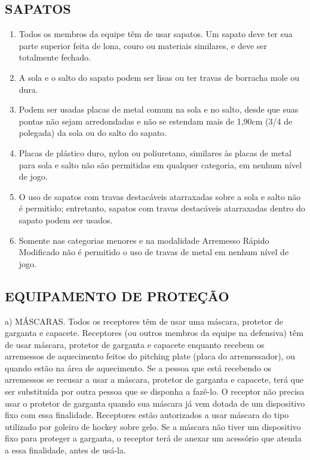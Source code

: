 \subsection{SAPATOS}
\begin{enumerate}[label=(\alph*)]
	\item Todos os membros da equipe têm de usar sapatos. Um sapato deve ter sua  parte superior feita de lona, couro ou materiais similares, e deve ser totalmente fechado.
	\item A sola e o salto do sapato podem ser lisas ou ter travas de borracha mole ou dura.
	\item Podem ser usadas placas de metal comum na sola e no salto, desde que suas pontas não sejam arredondadas e não se estendam mais de 1,90cm (3/4 de polegada) da sola ou do salto do sapato.
	\item Placas de plástico duro, nylon ou poliuretano, similares às placas de metal para sola e salto não são permitidas em qualquer categoria, em nenhum nível de jogo.
	\item O uso de sapatos com travas destacáveis atarraxadas sobre a sola e salto não é permitido; entretanto, sapatos com travas destacáveis atarraxadas dentro do sapato podem ser usados.
	\item Somente nas categorias menores e na modalidade Arremesso Rápido Modificado não é permitido o uso de travas de metal em nenhum nível de jogo.
\end{enumerate}


\subsection{EQUIPAMENTO DE PROTEÇÃO}

a) MÁSCARAS. Todos os receptores têm de usar uma máscara, protetor de garganta e capacete. Receptores (ou outros membros da equipe na defensiva) têm de usar máscara, protetor de garganta e capacete enquanto recebem os arremessos de aquecimento feitos do \gls{pitching plate} (placa do arremessador), ou quando estão na área de aquecimento. Se a pessoa que está recebendo os arremessos se recusar a usar a máscara, protetor de garganta e capacete, terá que ser substituída por outra pessoa que se disponha a fazê-lo. O receptor não precisa usar o protetor de garganta quando sua máscara já vem dotada de um dispositivo fixo com essa finalidade. Receptores estão autorizados a usar máscara do tipo utilizado por goleiro de hockey sobre gelo. Se a máscara não tiver um dispositivo fixo para proteger a garganta, o receptor terá de anexar um acessório que atenda a essa finalidade, antes de usá-la.

